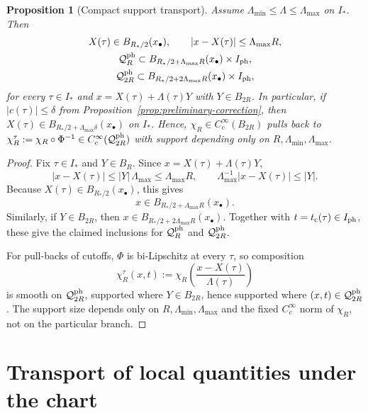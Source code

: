 \documentclass[11pt]{amsart}
\theoremstyle{plain}
\newtheorem{proposition}[theorem]{Proposition}
\theoremstyle{definition}
\theoremstyle{remark}
\begin{document}
\begin{proposition}[Compact support transport]\label{prop:domain}
Assume \(\Lambda_{\min}\le \Lambda\le \Lambda_{\max}\) on \(I_*\).
Then
\[
\begin{gathered}
X(\tau)\in B_{R_*/2}(x_\bullet),\qquad |x-X(\tau)|\le \Lambda_{\max}R,\\
\mathcal Q^{\rm ph}_{R}\subset B_{R_*/2+ \Lambda_{\max}R}(x_\bullet)\times I_{\rm ph},\\
\mathcal Q^{\rm ph}_{2R}\subset B_{R_*/2+2\Lambda_{\max}R}(x_\bullet)\times I_{\rm ph},
\end{gathered}
\]
for every \(\tau\in I_*\) and \(x=X(\tau)+\Lambda(\tau)Y\) with \(Y\in B_{2R}\).
In particular, if \(|c(\tau)|\le \delta\) from Proposition~\ref{prop:preliminary-correction},
then \(X(\tau)\in B_{R_*/2+\Lambda_{\max}\delta}(x_\bullet)\) on \(I_*\).
Hence, \(\chi_R\in C_c^\infty(B_{2R})\) pulls back to
\(\chi_R^\tau:=\chi_R\circ \Phi^{-1}\in C_c^\infty(\mathcal Q^{\rm ph}_{2R})\)
with support depending only on \(R,\Lambda_{\min},\Lambda_{\max}\).
\end{proposition}
\begin{proof}
Fix \(\tau\in I_*\) and \(Y\in B_R\). Since \(x=X(\tau)+\Lambda(\tau)Y\),
\[
|x-X(\tau)|\le |Y|\,\Lambda_{\max}\le \Lambda_{\max}R,\qquad
\Lambda_{\max}^{-1}|x-X(\tau)|\le |Y|.
\]
Because \(X(\tau)\in B_{R_*/2}(x_\bullet)\), this gives
\[
x\in B_{R_*/2+\Lambda_{\max}R}(x_\bullet).
\]
Similarly, if \(Y\in B_{2R}\), then \(x\in B_{R_*/2+2\Lambda_{\max}R}(x_\bullet)\).
Together with \(t=t_{\rm c}(\tau)\in I_{\rm ph}\), these give the claimed
inclusions for \(\mathcal Q_{R}^{\rm ph}\) and \(\mathcal Q_{2R}^{\rm ph}\).

For pull-backs of cutoffs, \(\Phi\) is bi-Lipschitz at every \(\tau\), so composition
\[
\chi_R^\tau(x,t):=\chi_R\!\left(\frac{x-X(\tau)}{\Lambda(\tau)}\right)
\]
is smooth on \(\mathcal Q^{\rm ph}_{2R}\), supported where
\(Y\in B_{2R}\), hence supported where \((x,t)\in\mathcal Q^{\rm ph}_{2R}\). The support size depends
only on \(R,\Lambda_{\min},\Lambda_{\max}\) and the fixed \(C_c^\infty\) norm of
\(\chi_R\), not on the particular branch.
\end{proof}

\section{Transport of local quantities under the chart}\label{sec:local-transfer}
\end{document}
